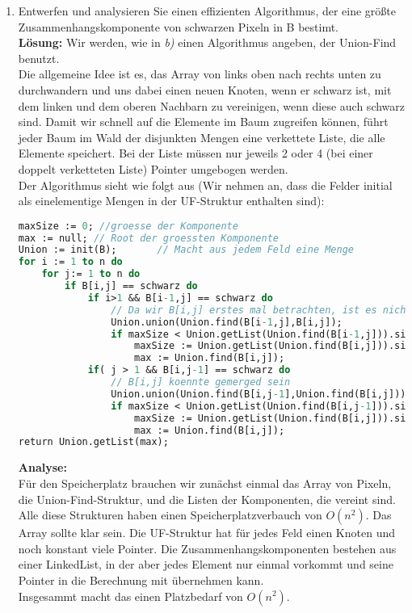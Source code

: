 \documentclass[11pt,a4paper,ngerman]{article}
\begin{document}
\begin{enumerate}[\bfseries (a)]

\item Entwerfen und analysieren Sie einen effizienten Algorithmus, der eine größte Zusammenhangskomponente von schwarzen Pixeln in B bestimt.\\

\textbf{Lösung:}
Wir werden, wie in \emph{b)} einen Algorithmus angeben, der Union-Find benutzt.\\
Die allgemeine Idee ist es, das Array von links oben nach rechts unten zu durchwandern und uns dabei einen neuen Knoten, wenn er schwarz ist, mit dem linken und dem oberen Nachbarn zu vereinigen, wenn diese auch schwarz sind. Damit wir schnell auf die Elemente im Baum zugreifen können, führt jeder Baum im Wald der disjunkten Mengen eine verkettete Liste, die alle Elemente speichert.
Bei der Liste müssen nur jeweils 2 oder 4 (bei einer doppelt verketteten Liste) Pointer umgebogen werden.\\
Der Algorithmus sieht wie folgt aus (Wir nehmen an, dass die Felder initial als einelementige Mengen in der UF-Struktur enthalten sind):
\begin{lstlisting}[language=Pascal]
maxSize := 0; //groesse der Komponente
max := null; // Root der groessten Komponente
Union := init(B);		// Macht aus jedem Feld eine Menge
for i := 1 to n do
	for j:= 1 to n do
		if B[i,j] == schwarz do
			if i>1 && B[i-1,j] == schwarz do
				// Da wir B[i,j] erstes mal betrachten, ist es nicht gemerged.
				Union.union(Union.find(B[i-1,j],B[i,j]);
				if maxSize < Union.getList(Union.find(B[i-1,j])).size() do				
					maxSize := Union.getList(Union.find(B[i,j])).size();
					max := Union.find(B[i,j]);
			if( j > 1 && B[i,j-1] == schwarz do
				// B[i,j] koennte gemerged sein
				Union.union(Union.find(B[i,j-1],Union.find(B[i,j]));
				if maxSize < Union.getList(Union.find(B[i,j-1])).size() do				
					maxSize := Union.getList(Union.find(B[i,j])).size();
					max := Union.find(B[i,j]);
return Union.getList(max);
\end{lstlisting}

\textbf{Analyse:}\\
Für den Speicherplatz brauchen wir zunächst einmal das Array von Pixeln, die Union-Find-Struktur, und die Listen der Komponenten, die vereint sind.\\
Alle diese Strukturen haben einen Speicherplatzverbauch von $O(n^2)$. Das Array sollte klar sein. Die UF-Struktur hat für jedes Feld einen Knoten und noch konstant viele Pointer. Die Zusammenhangskomponenten bestehen aus einer LinkedList, in der aber jedes Element nur einmal vorkommt und seine Pointer in die Berechnung mit übernehmen kann.\\
Insgesammt macht das einen Platzbedarf von $O(n^2)$.\\


\end{enumerate}
\end{document}
